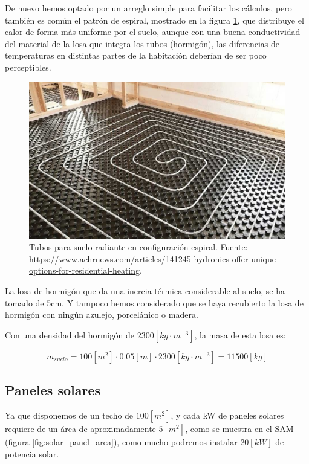 De nuevo hemos optado por un arreglo simple para facilitar los cálculos,
pero también es común el patrón de espiral, mostrado en la figura \ref{fig:spiral_pattern_floor},
que distribuye el calor de forma más uniforme por el suelo, aunque con una buena
conductividad del material de la losa que integra los tubos (hormigón), las diferencias de
temperaturas en distintas partes de la habitación deberían de ser poco perceptibles.

\begin{figure}[h] \centering
	\centering
	\includegraphics[width=1\textwidth]{./capitulos/resultados_discusion/images/spiral_pattern_floor.jpg}
	\caption{Tubos para suelo radiante en configuración espiral. Fuente: \url{https://www.achrnews.com/articles/141245-hydronics-offer-unique-options-for-residential-heating}.}
	\label{fig:spiral_pattern_floor}
\end{figure}

La losa de hormigón que da una inercia térmica considerable al suelo, se ha
tomado de 5cm. Y tampoco hemos considerado que se haya recubierto la losa de
hormigón con ningún azulejo, porcelánico o madera.

Con una densidad del hormigón de $2300[kg\cdot m^{-3}]$, la masa de esta losa es:

\begin{equation}
	m_{suelo} = 100[m^2] \cdot 0.05[m] \cdot 2300[kg\cdot m^{-3}] = 11500[kg]
\end{equation}


\subsection{Paneles solares}

Ya que disponemos de un techo de $100[m^2]$, y cada kW de paneles solares
requiere de un área de aproximadamente $5[m^2]$, como se muestra en el SAM
(figura \ref{fig:solar_panel_area}), como mucho podremos instalar $20[kW]$ de
potencia solar.

